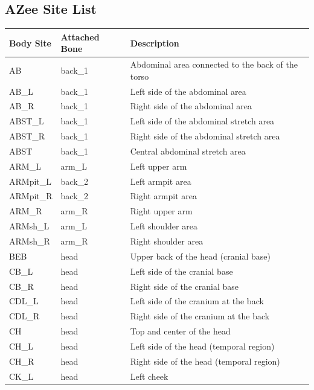 \documentclass[../main.tex]{subfiles}
\begin{document}
\subsection{AZee Site List}
\label{annex:background_work:azee_sites}

\begin{longtable}{|p{2cm}|p{3cm}|p{5cm}|}
    \hline
    \textbf{Body Site} & \textbf{Attached Bone} & \textbf{Description} \\ \hline
    AB & back\_1 & Abdominal area connected to the back of the torso \\ \hline
    AB\_L & back\_1 & Left side of the abdominal area \\ \hline
    AB\_R & back\_1 & Right side of the abdominal area \\ \hline
    ABST\_L & back\_1 & Left side of the abdominal stretch area \\ \hline
    ABST\_R & back\_1 & Right side of the abdominal stretch area \\ \hline
    ABST & back\_1 & Central abdominal stretch area \\ \hline
    ARM\_L & arm\_L & Left upper arm \\ \hline
    ARMpit\_L & back\_2 & Left armpit area \\ \hline
    ARMpit\_R & back\_2 & Right armpit area \\ \hline
    ARM\_R & arm\_R & Right upper arm \\ \hline
    ARMsh\_L & arm\_L & Left shoulder area \\ \hline
    ARMsh\_R & arm\_R & Right shoulder area \\ \hline
    BEB & head & Upper back of the head (cranial base) \\ \hline
    CB\_L & head & Left side of the cranial base \\ \hline
    CB\_R & head & Right side of the cranial base \\ \hline
    CDL\_L & head & Left side of the cranium at the back \\ \hline
    CDL\_R & head & Right side of the cranium at the back \\ \hline
    CH & head & Top and center of the head \\ \hline
    CH\_L & head & Left side of the head (temporal region) \\ \hline
    CH\_R & head & Right side of the head (temporal region) \\ \hline
    CK\_L & head & Left cheek \\ \hline

\end{longtable}
\end{document}
